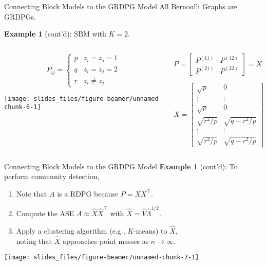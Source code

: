 \documentclass[
  ignorenonframetext,
]{beamer}
\providecommand{\tightlist}{%
  \setlength{\itemsep}{0pt}\setlength{\parskip}{0pt}}
\begin{document}
\begin{frame}{Connecting Block Models to the GRDPG Model}
\protect\hypertarget{connecting-block-models-to-the-grdpg-model}{}
All Bernoulli Graphs are GRDPGs.

\textbf{Example 1} (cont'd): SBM with \(K = 2\).

\begin{columns}[T]
\begin{column}{0.48\textwidth}
\[P_{ij} = \begin{cases} 
p & z_i = z_j = 1 \\
q & z_i = z_j = 2 \\
r & z_i \neq z_j
\end{cases}\]

\begin{center}\texttt{[image: slides\_files/figure-beamer/unnamed-chunk-6-1]} \end{center}
\end{column}

\begin{column}{0.48\textwidth}
\[P = 
\begin{bmatrix} 
P^{(11)} & P^{(12)} \\
P^{(21)} & P^{(22)}
\end{bmatrix} =
X I_{2,0} X^\top\]

\[X = \begin{bmatrix} 
\sqrt{p} & 0 \\
\vdots & \vdots \\
\sqrt{p} & 0 \\
\sqrt{r^2 / p} & \sqrt{q - r^2 / p} \\
\vdots & \vdots \\
\sqrt{r^2 / p} & \sqrt{q - r^2 / p}
\end{bmatrix}\]
\end{column}
\end{columns}
\end{frame}

\begin{frame}{Connecting Block Models to the GRDPG Model}
\protect\hypertarget{connecting-block-models-to-the-grdpg-model-1}{}
\textbf{Example 1} (cont'd): To perform community detection,

\begin{enumerate}
\tightlist
\item
  Note that \(A\) is a RDPG because \(P = X X^\top\).
\item
  Compute the ASE \(A \approx \hat{X} \hat{X}^\top\) with
  \(\hat{X} = \hat{V} \hat{\Lambda}^{1/2}\).
\item
  Apply a clustering algorithm (e.g., \(K\)-means) to \(\hat{X}\),\\
  noting that \(\hat{X}\) approaches point masses as \(n \to \infty\).
\end{enumerate}

\begin{center}\texttt{[image: slides\_files/figure-beamer/unnamed-chunk-7-1]} \end{center}
\end{frame}
\end{document}
